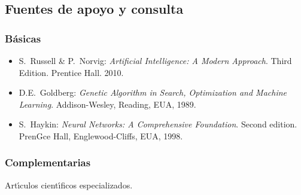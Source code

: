 \documentclass[10 pt]{article}
\begin{document}
\subsection{Fuentes de apoyo y consulta}
\subsubsection{B\'{a}sicas}

\begin{itemize}[itemsep=0em]
  
\item{S.\ {\sc Russell} \& P.\ {\sc Norvig}: {\em Artificial Intelligence: A Modern Approach}. Third Edition. Prentice Hall. 2010.}

\item{D.E.\ {\sc Goldberg}: {\em Genetic Algorithm in Search, Optimization and Machine Learning}. Addison-Wesley, Reading, EUA, 1989.}

\item{S.\ {\sc Haykin}: {\em Neural Networks: A Comprehensive Foundation}. Second edition. PrenGce Hall, Englewood-Cliffs, EUA, 1998.}

\end{itemize}

\subsubsection{Complementarias}

Art\'{\i}culos cient\'{\i}ficos especializados.

\label{final} %


\end{document}

